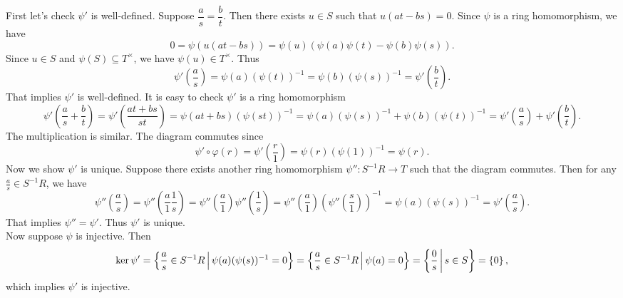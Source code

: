 \begin{prf}
    First let's check $\psi'$ is well-defined. Suppose $\dfrac{a}{s}=\dfrac{b}{t}$. Then there exists $u\in S$ such that $u(at-bs)=0$. Since $\psi$ is a ring homomorphism, we have 
    $$
    0=\psi(u(at-bs))=\psi(u)\left(\psi(a)\psi(t)-\psi(b)\psi(s)\right).
    $$
    Since $u\in S$ and $\psi(S)\subseteq T^\times$, we have $\psi(u)\in T^\times$. Thus
    $$
    \psi'\left(\frac{a}{s}\right)=\psi(a)(\psi(t))^{-1}=\psi(b)(\psi(s))^{-1}= \psi'\left(\frac{b}{t}\right).
    $$ 
    That implies $\psi'$ is well-defined. It is easy to check $\psi'$ is a ring homomorphism
    \[
        \psi'\left(\frac{a}{s}+\frac{b}{t}\right)=\psi'\left(\frac{at+bs}{st}\right)=\psi(at+bs)(\psi(st))^{-1}=\psi(a)(\psi(s))^{-1}+\psi(b)(\psi(t))^{-1}=\psi'\left(\frac{a}{s}\right)+\psi'\left(\frac{b}{t}\right).  
    \]
    The multiplication is similar. The diagram commutes since
    \[
        \psi'\circ\varphi(r)=\psi'\left(\frac{r}{1}\right)=\psi(r)(\psi(1))^{-1}=\psi(r).
    \]
    Now we show $\psi'$ is unique. Suppose there exists another ring homomorphism $\psi'':S^{-1}R\to T$ such that the diagram commutes. Then for any $\frac{a}{s}\in S^{-1}R$, we have 
    \[
        \psi''\left(\frac{a}{s}\right) = \psi''\left(\frac{a}{1}\frac{1}{s}\right) = \psi''\left(\frac{a}{1}\right)\psi''\left(\frac{1}{s}\right) = \psi''\left(\frac{a}{1}\right)\left(\psi''\left(\frac{s}{1}\right)\right)^{-1} = \psi\left(a\right)(\psi(s))^{-1} =    \psi'\left(\frac{a}{s}\right).
    \]
    That implies $\psi''=\psi'$. Thus $\psi'$ is unique.\\
    Now suppose $\psi$ is injective. Then 
    \[
    \ker \psi' = \left\{ \frac{a}{s} \in S^{-1}R \,\middle\vert\, \psi(a)(\psi(s))^{-1} = 0 \right\} = \left\{ \frac{a}{s} \in S^{-1}R \,\middle\vert\, \psi(a) = 0 \right\} = \left\{ \frac{0}{s} \,\middle\vert\, s \in S \right\} = \left\{ 0 \right\},    
    \]
    which implies $\psi'$ is injective.
\end{prf}

